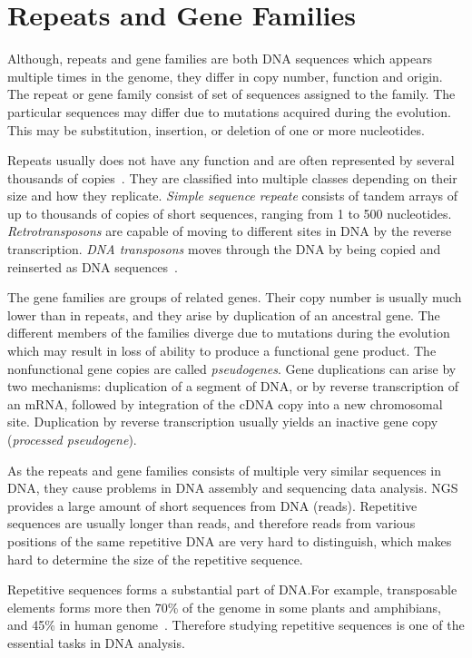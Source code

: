 \chapter[Rep.\ and Gene Fam.]{Repeats and Gene Families}\label{chap:repeatsfamilies}

Although, repeats and gene families are both DNA sequences which appears multiple times in the genome, they differ in copy number, function and origin.
The repeat or gene family consist of set of sequences assigned to the family. The particular sequences may differ due to mutations acquired during the evolution. This may be substitution, insertion, or deletion of one or more nucleotides.

Repeats usually does not have any function and are often represented by several thousands of copies~\cite{cell}. They are classified into multiple classes depending on their size and how they replicate.
\emph{Simple sequence repeate} consists of tandem arrays of up to thousands of copies of short sequences, ranging from 1 to 500 nucleotides.
\emph{Retrotransposons} are capable of moving to different sites in DNA by the reverse transcription.
\emph{DNA transposons} moves through the DNA by being copied and reinserted as DNA sequences~\cite{cell}.

The gene families are groups of related genes.
Their copy number is usually much lower than in repeats, and they arise by duplication of an ancestral gene. The different members of the families diverge due to mutations during the evolution which may result in loss of ability to produce a functional gene product. The nonfunctional gene copies are called \emph{pseudogenes}.
Gene duplications can arise by two mechanisms: duplication of a segment of DNA, or by reverse transcription of an mRNA, followed by integration of the cDNA copy into a new chromosomal site.
Duplication by reverse transcription usually yields an inactive gene copy (\emph{processed pseudogene}).

As the repeats and gene families consists of multiple very similar sequences in DNA, they cause problems in DNA assembly and sequencing data analysis. NGS provides a large amount of short sequences from DNA (reads). Repetitive sequences are usually longer than reads, and therefore reads from various positions of the same repetitive DNA are very hard to distinguish, which makes hard to determine the size of the repetitive sequence.

Repetitive sequences forms a substantial part of DNA.\@ For example,
transposable elements forms more then 70\% of the genome in some plants and amphibians, and 45\% in human genome~\cite{biemont2006genetics}.
Therefore studying repetitive sequences is one of the essential tasks in DNA analysis.

